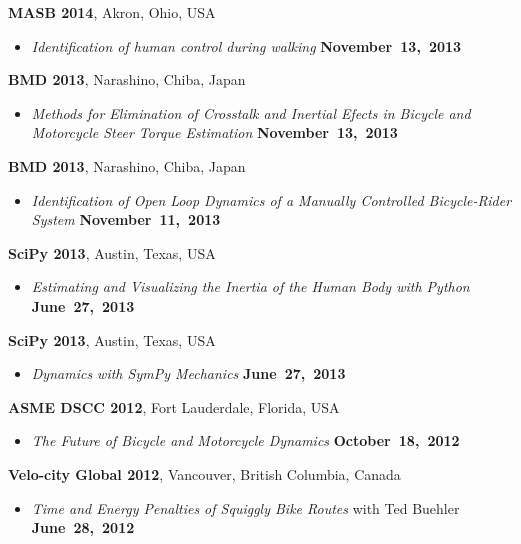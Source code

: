 \documentclass[10pt]{article}
\newenvironment{outerlist}[1][\enskip\textbullet]%
        {\begin{itemize}[#1]}{\end{itemize}%
         \vspace{-.6\baselineskip}}
\newcommand{\blankline}{\quad\pagebreak[2]}
\begin{document}
\blankline

\textbf{MASB 2014}, Akron, Ohio, USA
\begin{outerlist}
\item[] \textit{Identification of human control during walking}
    \hfill \textbf{November~13,~2013}
\end{outerlist}

\blankline

\textbf{BMD 2013}, Narashino, Chiba, Japan
\begin{outerlist}
  \item[] \textit{Methods for Elimination of Crosstalk and Inertial Efects in
    Bicycle and Motorcycle Steer Torque Estimation}
    \hfill \textbf{November~13,~2013}
\end{outerlist}

\blankline

\textbf{BMD 2013}, Narashino, Chiba, Japan
\begin{outerlist}
  \item[] \textit{Identification of Open Loop Dynamics of a Manually Controlled
    Bicycle-Rider System}
    \hfill \textbf{November~11,~2013}
\end{outerlist}

\blankline

\textbf{SciPy 2013}, Austin, Texas, USA
\begin{outerlist}
  \item[] \textit{Estimating and Visualizing the Inertia of the Human Body with
    Python}
    \hfill \textbf{June~27,~2013}
\end{outerlist}

\blankline

\textbf{SciPy 2013}, Austin, Texas, USA
\begin{outerlist}
  \item[] \textit{Dynamics with SymPy Mechanics}
    \hfill \textbf{June~27,~2013}
\end{outerlist}

\blankline

\textbf{ASME DSCC 2012}, Fort Lauderdale, Florida, USA
\begin{outerlist}
  \item[] \textit{The Future of Bicycle and Motorcycle Dynamics}
    \hfill \textbf{October~18,~2012}
\end{outerlist}

\blankline

\textbf{Velo-city Global 2012}, Vancouver, British Columbia, Canada
\begin{outerlist}
  \item[] \textit{Time and Energy Penalties of Squiggly Bike Routes} with Ted
    Buehler
  \hfill \textbf{June~28,~2012}
\end{outerlist}
\end{document}
